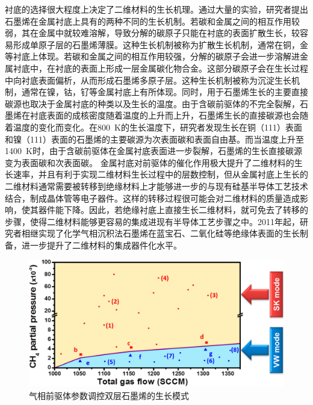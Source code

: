     衬底的选择很大程度上决定了二维材料的生长机理。通过大量的实验，研究者提出石墨烯在金属衬底上具有的两种不同的生长机制。若碳和金属之间的相互作用较弱，其在金属中就较难溶解，导致分解的碳原子只能在衬底的表面扩散生长，较容易形成单原子层的石墨烯薄膜。这种生长机制被称为扩散生长机制，通常在铜，金等衬底上体现。若碳和金属之间的相互作用较强，分解的碳原子会进一步溶解进金属衬底中，在衬底的表面上形成一层金属碳化物合金。这部分碳原子会在生长过程中向衬底表面偏析，从而形成石墨烯多原子层。这种生长机制被称为沉淀生长机制，通常在镍，钴，钌等金属衬底上有所体现。同时，用于石墨烯生长的主要直接碳源也取决于金属衬底的种类以及生长的温度。由于含碳前驱体的不完全裂解，石墨烯在衬底表面的成核密度随着温度的上升而上升，石墨烯生长的直接碳源也会随着温度的变化而变化。在\SI{800}{\kelvin}的生长温度下，研究者发现生长在铜（111）表面和镍（111）表面的石墨烯的主要碳源为次表面碳和表面自由基。而当温度上升至\SI{1400}{\kelvin}时，由于含碳前驱体在金属衬底表面进一步裂解，石墨烯的生长直接碳源变为表面碳和次表面碳。
    金属衬底对前驱体的催化作用极大提升了二维材料的生长速率，并且有利于实现二维材料生长过程中的层数控制，但从金属衬底上生长的二维材料通常需要被转移到绝缘材料上才能够进一步的与现有硅基半导体工艺技术结合，制成晶体管等电子器件。这样的转移过程很可能会对二维材料的质量造成影响，使其器件能下降。因此，若绝缘衬底上直接生长二维材料，就可免去了转移的步骤，使得二维材料能够更容易的集成进现有半导体工艺步骤之中。2011年起，研究者相继实现了化学气相沉积法石墨烯在蓝宝石、二氧化硅等绝缘体表面的生长制备，进一步提升了二维材料的集成器件化水平。

    \begin{figure}[htb]
        \includegraphics{pic/INTRO_growth_grapheneGasModeSwitchn.png}    
        \caption{气相前驱体参数调控双层石墨烯的生长模式}
    \end{figure}

